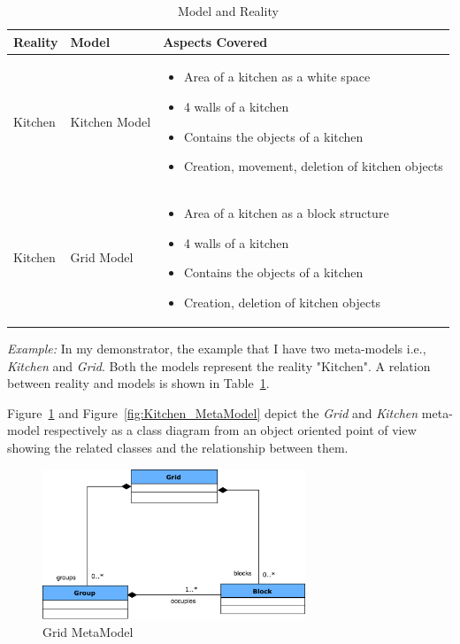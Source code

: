 \begin{table}
	\centering	
	\begin{tabular}{|p{3cm}|p{3cm}|p{8cm}|}
		\hline
		\rowcolor[gray]{.8}	
		\textbf{Reality} & \textbf{Model} & \textbf{Aspects Covered} \\
		\hline
		Kitchen & Kitchen Model & 
		\begin{itemize}
			\item Area of a kitchen as a white space
			\item 4 walls of a kitchen
			\item Contains the objects of a kitchen
			\item Creation, movement, deletion of kitchen objects
		\end{itemize}\\
		\hline
		Kitchen & Grid Model & 
		\begin{itemize}
			\item Area of a kitchen as a block structure
			\item 4 walls of a kitchen
			\item Contains the objects of a kitchen
			\item Creation, deletion of kitchen objects
		\end{itemize}\\
		\hline					
		
	\end{tabular}
	\caption{Model and Reality}
	\label{tab:Model_Reality}
\end{table}

\textit{Example:} In my demonstrator, the example that I have two meta-models i.e., \textit{Kitchen} and \textit{Grid}. Both the models represent the reality "Kitchen". A relation between reality and models is shown in Table~\ref{tab:Model_Reality}. 

Figure~\ref{fig:Grid_MetaModel} and Figure~\ref{fig:Kitchen_MetaModel} depict the \textit{Grid} and \textit{Kitchen} meta-model respectively as a class diagram from an object oriented point of view showing the related classes and the relationship between them.

\begin{figure}[h]
	\centering
	\includegraphics[width=0.7\textwidth]{figures/Grid_MetaModel}
	\caption{Grid MetaModel}
	\label{fig:Grid_MetaModel}
\end{figure}

